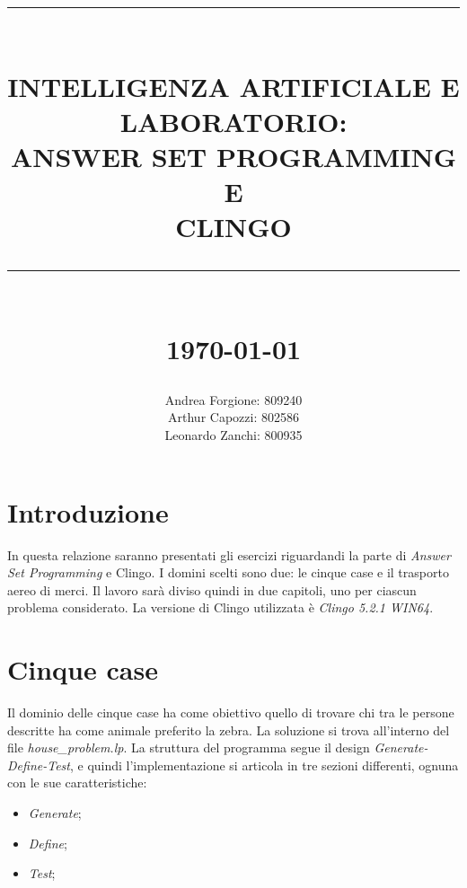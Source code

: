 \documentclass[12pt]{report}
\newcommand{\HRule}[1]{\rule{\linewidth}{#1}}
\begin{document}
\title{ \normalsize \textsc{}
        \\ [2.0cm]
        \HRule{0.5pt} \\
        \LARGE \textbf{\uppercase{Intelligenza Artificiale e Laboratorio: \\ Answer Set Programming \\e\\ Clingo}}
        \HRule{2pt} \\ [0.5cm]
        \normalsize \today \vspace*{5\baselineskip}}

\date{}

\author{
        Andrea Forgione: 809240 \\ 
        Arthur Capozzi:  802586 \\
        Leonardo Zanchi: 800935}

\maketitle
\tableofcontents
\newpage

\sectionfont{\scshape}


\chapter*{Introduzione}

In questa relazione saranno presentati gli esercizi riguardandi la parte di \emph{Answer Set Programming} e Clingo.
I domini scelti sono due: le cinque case e il trasporto aereo di merci.
Il lavoro sarà diviso quindi in due capitoli, uno per ciascun problema considerato.
La versione di Clingo utilizzata è \emph{Clingo 5.2.1 WIN64}.

\chapter{Cinque case}
Il dominio delle cinque case ha come obiettivo quello di trovare chi tra le persone descritte ha come animale preferito la zebra.
La soluzione si trova all'interno del file \emph{house\_problem.lp}.
La struttura del programma segue il design \emph{Generate-Define-Test}, e quindi l'implementazione si articola in tre sezioni differenti, ognuna con le sue caratteristiche: 
\begin{itemize}
\item \emph{Generate};
\item \emph{Define};
\item \emph{Test};
\end{itemize}
\end{document}
